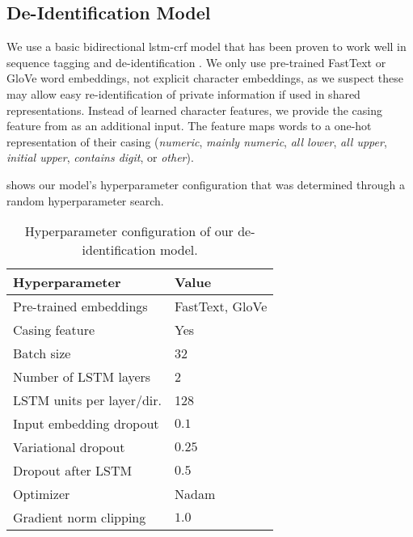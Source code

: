 \subsection{De-Identification Model}\label{sec:deidentification-model}
%
We use a basic bidirectional \ac{lstm}-\ac{crf} model that has been proven to work well in sequence tagging \citep{huang2015bidirectional,lample2016neural} and de-identification \citep{dernoncourt2017identification,liu2017identification}.
%
We only use pre-trained FastText \citep{bojanowski2016enriching} or GloVe \citep{pennington2014glove} word embeddings, not explicit character embeddings, as we suspect these may allow easy re-identification of private information if used in shared representations.
%
Instead of learned character features, we provide the casing feature from \citet{reimers2017optimal} as an additional input.
%
The feature maps words to a one-hot representation of their casing (\textit{numeric}, \textit{mainly numeric}, \textit{all lower}, \textit{all upper}, \textit{initial upper}, \textit{contains digit}, or \textit{other}).

%
 shows our model's hyperparameter configuration that was determined through a random hyperparameter search.

\begin{table}
    \centering
    \begin{tabular}{ll}
     \toprule
     Hyperparameter & Value\\
     \midrule
     Pre-trained embeddings & FastText, GloVe\\
     Casing feature & Yes\\
     Batch size & 32\\
     Number of LSTM layers & 2\\
     LSTM units per layer/dir. & 128\\
     Input embedding dropout & $0.1$\\
     Variational dropout & $0.25$\\
     Dropout after LSTM & $0.5$\\
     Optimizer & Nadam\\
     Gradient norm clipping & $1.0$\\
     \bottomrule
    \end{tabular}
    \caption{Hyperparameter configuration of our de-identification model.}\label{tab:deid-hyperparameters}
\end{table}


